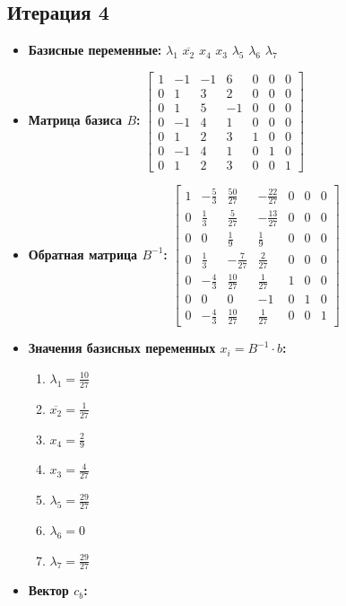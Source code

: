 \begin{itemize}
\subsection*{Итерация 4}
\begin{itemize}
\item \textbf{Базисные переменные:}
$\lambda_1$
$\overline{x_2}$
$x_4$
$x_3$
$\lambda_5$
$\lambda_6$
$\lambda_7$
\item \textbf{Матрица базиса $B$:}
$\left[\begin{matrix}1 & -1 & -1 & 6 & 0 & 0 & 0\\0 & 1 & 3 & 2 & 0 & 0 & 0\\0 & 1 & 5 & -1 & 0 & 0 & 0\\0 & -1 & 4 & 1 & 0 & 0 & 0\\0 & 1 & 2 & 3 & 1 & 0 & 0\\0 & -1 & 4 & 1 & 0 & 1 & 0\\0 & 1 & 2 & 3 & 0 & 0 & 1\end{matrix}\right]$
\item \textbf{Обратная матрица $B^{-1}$:}
$\left[\begin{matrix}1 & - \frac{5}{3} & \frac{50}{27} & - \frac{22}{27} & 0 & 0 & 0\\0 & \frac{1}{3} & \frac{5}{27} & - \frac{13}{27} & 0 & 0 & 0\\0 & 0 & \frac{1}{9} & \frac{1}{9} & 0 & 0 & 0\\0 & \frac{1}{3} & - \frac{7}{27} & \frac{2}{27} & 0 & 0 & 0\\0 & - \frac{4}{3} & \frac{10}{27} & \frac{1}{27} & 1 & 0 & 0\\0 & 0 & 0 & -1 & 0 & 1 & 0\\0 & - \frac{4}{3} & \frac{10}{27} & \frac{1}{27} & 0 & 0 & 1\end{matrix}\right]$
\item \textbf{Значения базисных переменных $ x_i = B^{-1} \cdot b$:}
\begin{enumerate}
\item $\lambda_1 = \frac{10}{27}$
\item $\overline{x_2} = \frac{1}{27}$
\item $x_4 = \frac{2}{9}$
\item $x_3 = \frac{4}{27}$
\item $\lambda_5 = \frac{29}{27}$
\item $\lambda_6 = 0$
\item $\lambda_7 = \frac{29}{27}$
\end{enumerate}
\item \textbf{Вектор $c_b$:}

\end{itemize}
\end{itemize}

